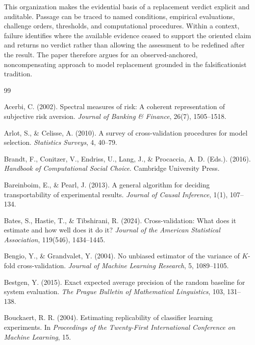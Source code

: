 \documentclass[11pt]{article}
\theoremstyle{remark}
\begin{document}
This organization makes the evidential basis of a replacement verdict explicit
and auditable. Passage can be traced to named conditions, empirical
evaluations, challenge orders, thresholds, and computational procedures.
Within a context, failure identifies where the available evidence ceased to support the oriented
claim and returns no verdict rather than allowing the assessment to be
redefined after the result. The paper therefore argues for an observed-anchored,
noncompensating approach to model replacement grounded in the falsificationist
tradition.

\clearpage
\begin{thebibliography}{99}
\setlength{\itemsep}{0.25em}

Acerbi, C. (2002).
Spectral measures of risk: A coherent representation of subjective risk aversion.
\emph{Journal of Banking \& Finance}, 26(7), 1505--1518.

Arlot, S., \& Celisse, A. (2010).
A survey of cross-validation procedures for model selection.
\emph{Statistics Surveys}, 4, 40--79.

Brandt, F., Conitzer, V., Endriss, U., Lang, J., \& Procaccia, A. D. (Eds.). (2016).
\emph{Handbook of Computational Social Choice}.
Cambridge University Press.

Bareinboim, E., \& Pearl, J. (2013).
A general algorithm for deciding transportability of experimental results.
\emph{Journal of Causal Inference}, 1(1), 107--134.

Bates, S., Hastie, T., \& Tibshirani, R. (2024).
Cross-validation: What does it estimate and how well does it do it?
\emph{Journal of the American Statistical Association}, 119(546), 1434--1445.

Bengio, Y., \& Grandvalet, Y. (2004).
No unbiased estimator of the variance of $K$-fold cross-validation.
\emph{Journal of Machine Learning Research}, 5, 1089--1105.

Bestgen, Y. (2015).
Exact expected average precision of the random baseline for system evaluation.
\emph{The Prague Bulletin of Mathematical Linguistics}, 103, 131--138.

Bouckaert, R. R. (2004).
Estimating replicability of classifier learning experiments.
In \emph{Proceedings of the Twenty-First International Conference on Machine Learning}, 15.


\end{thebibliography}
\end{document}
